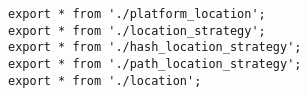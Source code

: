 \begin{verbatim}
export * from './platform_location';
export * from './location_strategy';
export * from './hash_location_strategy';
export * from './path_location_strategy';
export * from './location';
\end{verbatim}
